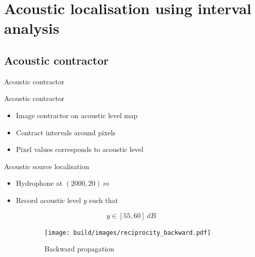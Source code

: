 \documentclass[9pt, xcolor={usenames, dvipsnames}]{beamer}
\begin{document}
		\section{Acoustic localisation using interval analysis}

			\subsection{Acoustic contractor}

				\begin{frame}{Acoustic contractor}
					\centering
					\begin{minipage}[t]{0.6\textwidth}
						\begin{block}{Acoustic contractor}
							\begin{itemize}
								\item Image contractor on acoustic level map
								\item Contract intervals around pixels
								\item Pixel values corresponds to acoustic level
							\end{itemize}
						\end{block}
						\vspace{1cm}
						\begin{exampleblock}{Acoustic source localisation}
							\begin{itemize}
								\item Hydrophone at $(2000, 20)\ m$
								\item Record acoustic level $y$ such that
							\end{itemize}
							\begin{equation}
								y \in [55, 60]\ dB
							\end{equation}
						\end{exampleblock}
					\end{minipage}
					\hfill
					\begin{minipage}[t]{0.35\textwidth}
						\begin{figure}[!htb]
							\begin{subfigure}[!htb]{\textwidth}
								\texttt{[image: build/images/reciprocity\_backward.pdf]}
								\caption{Backward propagation}
							\end{subfigure}
							\begin{subfigure}[!htb]{\textwidth}

\end{subfigure}
\end{figure}
\end{minipage}
\end{frame}
\end{document}

